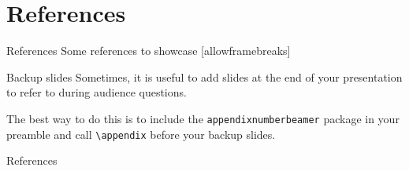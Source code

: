 \documentclass[10pt]{beamer}
\begin{document}
\section{References}
\begin{frame}{References}
  Some references to showcase [allowframebreaks] \cite{knuth92,ConcreteMath,Simpson,Er01,greenwade93}
\end{frame}

\appendix

\begin{frame}[fragile]{Backup slides}
  Sometimes, it is useful to add slides at the end of your presentation to
  refer to during audience questions.

  The best way to do this is to include the \verb|appendixnumberbeamer|
  package in your preamble and call \verb|\appendix| before your backup slides.
\end{frame}

\begin{frame}[allowframebreaks]{References}
  
  
\end{frame}
\end{document}
